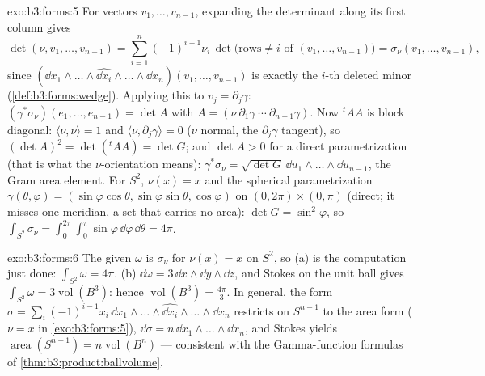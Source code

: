\begin{solution}{exo:b3:forms:5}
For vectors $v_1, \dots, v_{n-1}$, expanding the determinant
along its first column gives
\[
\det(\nu, v_1, \dots, v_{n-1}) =
\sum_{i=1}^n(-1)^{i-1}\nu_i\,
\det\bigl(\text{rows} \neq i \text{ of } (v_1, \dots,
v_{n-1})\bigr)
= \sigma_\nu(v_1, \dots, v_{n-1}),
\]
since $(\dd x_1\wedge\dots\wedge\widehat{\dd
x_i}\wedge\dots\wedge\dd x_n)(v_1, \dots, v_{n-1})$ is
exactly the $i$-th deleted minor
(\cref{def:b3:forms:wedge}). Applying this to $v_j =
\partial_j\gamma$: $(\gamma^*\sigma_\nu)(e_1, \dots,
e_{n-1}) = \det A$ with $A = (\nu\ \partial_1\gamma\ \cdots\
\partial_{n-1}\gamma)$. Now ${}^t\!AA$ is block diagonal:
$\langle\nu, \nu\rangle = 1$ and $\langle\nu,
\partial_j\gamma\rangle = 0$ ($\nu$ normal, the
$\partial_j\gamma$ tangent), so $(\det A)^2 =
\det({}^t\!AA) = \det G$; and $\det A > 0$ for a direct
parametrization (that is what the $\nu$-orientation means):
$\gamma^*\sigma_\nu = \sqrt{\det G}\,\dd
u_1\wedge\dots\wedge\dd u_{n-1}$, the Gram area element. For
$S^2$, $\nu(x) = x$ and the spherical parametrization
$\gamma(\theta, \varphi) = (\sin\varphi\cos\theta,
\sin\varphi\sin\theta, \cos\varphi)$ on
$(0,2\pi)\times(0,\pi)$ (direct; it misses one meridian, a
set that carries no area): $\det G = \sin^2\varphi$, so
$\int_{S^2}\sigma_\nu =
\int_0^{2\pi}\!\!\int_0^\pi\sin\varphi\,\dd\varphi\,
\dd\theta = 4\pi$.
\end{solution}

\begin{solution}{exo:b3:forms:6}
The given $\omega$ is $\sigma_\nu$ for $\nu(x) = x$ on
$S^2$, so (a) is the computation just done:
$\int_{S^2}\omega = 4\pi$. (b) $\dd\omega = 3\,\dd
x\wedge\dd y\wedge\dd z$, and Stokes on the unit ball gives
$\int_{S^2}\omega = 3\operatorname{vol}(B^3)$: hence
$\operatorname{vol}(B^3) = \frac{4\pi}3$. In general, the
form $\sigma = \sum_i(-1)^{i-1}x_i\,\dd
x_1\wedge\dots\wedge\widehat{\dd x_i}\wedge\dots\wedge\dd
x_n$ restricts on $S^{n-1}$ to the area form ($\nu = x$ in
\cref{exo:b3:forms:5}), $\dd\sigma = n\,\dd
x_1\wedge\dots\wedge\dd x_n$, and Stokes yields
$\operatorname{area}(S^{n-1}) = n\operatorname{vol}(B^n)$
--- consistent with the Gamma-function formulas of
\cref{thm:b3:product:ballvolume}.
\end{solution}

